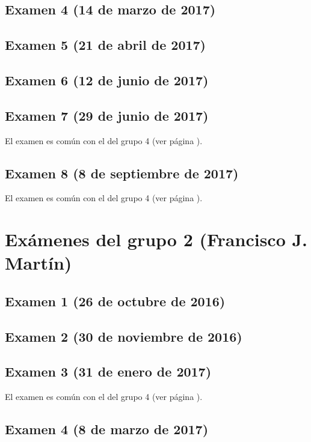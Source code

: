 \documentclass[a4paper,12pt,twoside]{book}
\begin{document}
\subsection{Examen 4 (14 de marzo de 2017)}
\subsection{Examen 5 (21 de abril de 2017)}
\subsection{Examen 6 (12 de junio de 2017)} 
 \label{examen_16_17_1_6}
\subsection{Examen 7 (29 de junio de 2017)}
El examen es común con el del grupo 4 (ver página \pageref{examen_16_17_4_7}).
\subsection{Examen 8 (8 de septiembre de 2017)}
El examen es común con el del grupo 4 (ver página \pageref{examen_16_16_4_8}).

\section{Exámenes del grupo 2 (Francisco J. Martín)}
\subsection{Examen 1 (26 de octubre de 2016)}
\subsection{Examen 2 (30 de noviembre de 2016)}
\subsection{Examen 3 (31 de enero de 2017)}
El examen es común con el del grupo 4 (ver página \pageref{examen_16_17_4_3}).
\subsection{Examen 4 (8 de marzo de 2017)}
\end{document}
